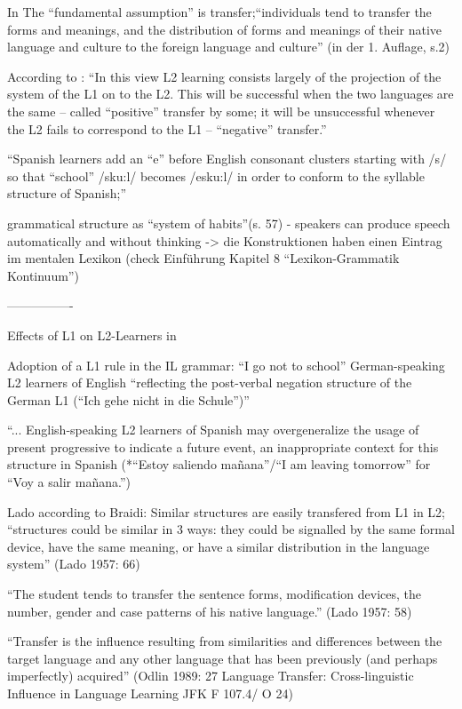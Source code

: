 In \cite{Lado71} The ``fundamental assumption'' is transfer;``individuals tend to transfer the forms and meanings, and the distribution of forms and meanings of their native language and culture to the foreign language and culture'' (in der 1. Auflage, s.2)

According to \cite{Cook93}: ``In this view L2 learning consists largely of the projection of the system of the L1 on to the L2.
This will be successful when the two languages are the same -- called ``positive'' transfer by some;
it will be unsuccessful whenever the L2 fails to correspond to the L1 -- ``negative'' transfer.''

``Spanish learners add an ``e'' before English consonant clusters starting with /s/ so that ``school'' /sku:l/ becomes /esku:l/ in order to conform to the syllable structure of Spanish;''

grammatical structure as ``system of habits''(s. 57) - speakers can produce speech automatically and without thinking -> die Konstruktionen haben einen Eintrag im mentalen Lexikon (check Einführung \cite{Ziem13} Kapitel 8 ``Lexikon-Grammatik Kontinuum'')

----------------

Effects of L1 on L2-Learners in \cite{Braidi99}


Adoption of a L1 rule in the IL grammar:
``I go not to school'' German-speaking L2 learners of English ``reflecting the post-verbal negation structure
of the German L1 (``Ich gehe nicht in die Schule'')''

``... English-speaking L2 learners of Spanish may overgeneralize the usage of present progressive to indicate a
future event, an inappropriate context for this structure in Spanish (*``Estoy saliendo mañana''/``I am leaving tomorrow''
for ``Voy a salir mañana.'')


Lado according to Braidi:
Similar structures are easily transfered from L1 in L2;
``structures could be similar in 3 ways: they could be signalled by the same formal device, have the same meaning,
or have a similar distribution in the language system'' (Lado 1957: 66)

``The student tends to transfer the sentence forms, modification devices, the number, gender and case patterns of
his native language.'' (Lado 1957: 58)

``Transfer is the influence resulting from similarities and differences between the target language and any other
language that has been previously (and perhaps imperfectly) acquired'' (Odlin 1989: 27 Language Transfer: Cross-linguistic Influence in Language Learning
JFK F 107.4/ O 24)

